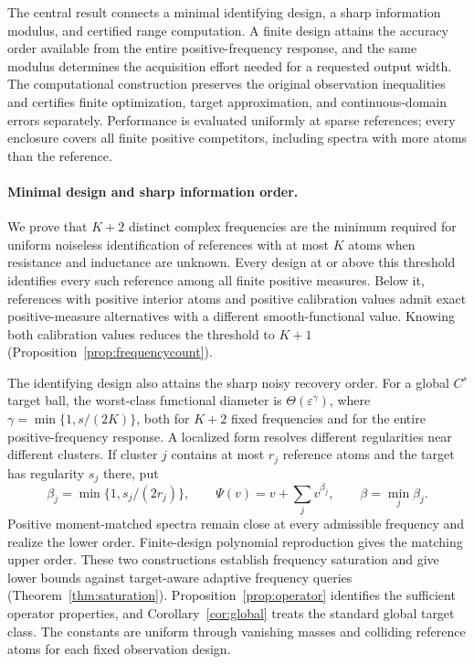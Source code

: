 \documentclass[10pt]{amsart}
\theoremstyle{definition}
\theoremstyle{remark}
\newcommand{\eps}{\varepsilon}
\begin{document}
The central result connects a minimal identifying design, a sharp information modulus, and certified range computation. A finite design attains the accuracy order available from the entire positive-frequency response, and the same modulus determines the acquisition effort needed for a requested output width. The computational construction preserves the original observation inequalities and certifies finite optimization, target approximation, and continuous-domain errors separately. Performance is evaluated uniformly at sparse references; every enclosure covers all finite positive competitors, including spectra with more atoms than the reference.

\paragraph{Minimal design and sharp information order.}
We prove that $K+2$ distinct complex frequencies are the minimum required for uniform noiseless identification of references with at most $K$ atoms when resistance and inductance are unknown. Every design at or above this threshold identifies every such reference among all finite positive measures. Below it, references with positive interior atoms and positive calibration values admit exact positive-measure alternatives with a different smooth-functional value. Knowing both calibration values reduces the threshold to $K+1$ (Proposition~\ref{prop:frequencycount}).

The identifying design also attains the sharp noisy recovery order. For a global $C^s$ target ball, the worst-class functional diameter is $\Theta(\eps^\gamma)$, where $\gamma=\min\{1,s/(2K)\}$, both for $K+2$ fixed frequencies and for the entire positive-frequency response. A localized form resolves different regularities near different clusters. If cluster $j$ contains at most $r_j$ reference atoms and the target has regularity $s_j$ there, put
\begin{equation}\label{eq:rates-summary}
 \beta_j=\min\{1,s_j/(2r_j)\},\qquad
 \Psi(v)=v+\sum_jv^{\beta_j},\qquad \beta=\min_j\beta_j.
\end{equation}
Positive moment-matched spectra remain close at every admissible frequency and realize the lower order. Finite-design polynomial reproduction gives the matching upper order. These two constructions establish frequency saturation and give lower bounds against target-aware adaptive frequency queries (Theorem~\ref{thm:saturation}). Proposition~\ref{prop:operator} identifies the sufficient operator properties, and Corollary~\ref{cor:global} treats the standard global target class. The constants are uniform through vanishing masses and colliding reference atoms for each fixed observation design.
\end{document}

